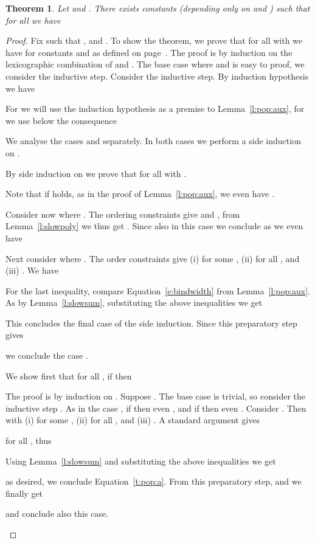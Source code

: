 \documentclass{LMCS}
\newtheorem{theorem}[thm]{Theorem}
\begin{document}
\begin{theorem}\label{t:pop}
  Let  and . There exists constants  
  (depending only on  and ) such that 
  for all  we have 
  
\end{theorem}
\begin{proof}
  Fix  such that ,  and .
To show the theorem, we prove that for all  with  
  we have  
  for constants  and  as defined on page~\pageref{d:dkp:ckp}.
  The proof is by induction on the lexicographic combination of  and .
  The base case where  and  is easy to proof, we consider the inductive 
  step. 
  Consider the inductive step. By induction hypothesis 
  we have 
  
  For  we will use the induction hypothesis as a premise to Lemma~\ref{l:pop:aux}, 
  for  we use below the consequence
  
  We analyse the cases  and  separately. 
  In both cases we perform a side induction on . 
  \smallskip 
  \begin{description}[leftmargin=0.3cm]
  \item[\dcase{}]
    By side induction on  we prove that 
    for all  with .
    
    Note that if  holds, 
    as in the proof of Lemma~\ref{l:pop:aux},
    we even have . 

    Consider now  where . 
    The ordering constraints give  and
    , 
    from Lemma~\ref{l:slowpoly} we thus get . 
Since also  in this case
    we conclude as we even have
    

    Next consider  where .
    The order constraints give
    (i)  for some ,
    (ii)  for all , and
    (iii) .
    We have 
    
    For the last inequality, compare Equation~\eqref{e:bindwidth} from Lemma~\ref{l:pop:aux}.
    As  by Lemma~\ref{l:slowsum}, substituting 
    the above inequalities we get
    
    This concludes the final case of the side induction.
    Since  this preparatory step gives
    
    we conclude the case .

    \medskip

  \item[\dcase{}]
We show first that for all , if  then
    
    The proof is by induction on . 
    Suppose . 
    The base case  is trivial, so consider the inductive step .
    As in the case ,
    if  then even , 
    and if  then even .
    Consider .
    Then  with 
    (i)  for some ,
    (ii)  for all , and
    (iii) .
    A standard argument gives
    
    for all , thus
    
    Using Lemma~\ref{l:slowsum} and substituting 
    the above inequalities we get
    
    as desired, we conclude Equation~\eqref{t:pop:a}.
From this preparatory step,  
    and  we finally get
    
    and conclude also this case.\qedhere
  \end{description}
\end{proof}
\end{document}
